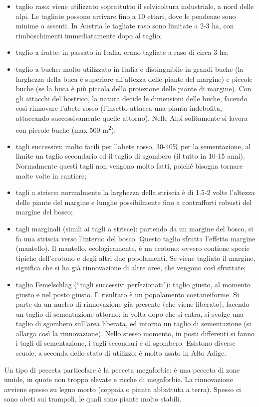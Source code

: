 \begin{itemize}[nosep]
    \item taglio raso: viene utilizzato soprattutto il selvicoltura industriale, a nord delle alpi. Le tagliate possono arrivare fino a 10 ettari, dove le pendenze sono minime o assenti. In Austria le tagliate raso sono limitate a 2-3 ha, con rimboschimenti immediatamente dopo al taglio;
    \item taglio a fratte: in passato in Italia, erano tagliate a raso di circa 3 ha;
    \item taglio a buche: molto utilizzato in Italia e distinguibile in grandi buche (la larghezza della buca è superiore all'altezza delle piante del margine) e piccole buche (se la buca è più piccola della proiezione delle piante di margine). Con gli attacchi del bostrico, la natura decide le dimensioni delle buche, facendo così rinnovare l'abete rosso (l'insetto attacca una pianta indebolita, attaccando successivamente quelle attorno). Nelle Alpi solitamente si lavora con piccole buche (max 500 \unit{m^2});
    \item tagli successivi: molto facili per l'abete rosso, 30-40\% per la sementazione, al limite un taglio secondario ed il taglio di sgombero (il tutto in 10-15 anni). Normalmente questi tagli non vengono molto fatti, poiché bisogna tornare molte volte in cantiere;
    \item tagli a strisce: normalmente la larghezza della striscia è di 1.5-2 volte l'altezza delle piante del margine e lunghe possibilmente fino a contrafforti robusti del margine del bosco;
    \item tagli marginali (simili ai tagli a strisce): partendo da un margine del bosco, si fa una striscia verso l'interno del bosco. Questo taglio sfrutta l'effetto margine (mantello). Il mantello, ecologicamente, è un ecotono: ovvero contiene specie tipiche dell'ecotono e degli altri due popolamenti. Se viene tagliato il margine, significa che si ha già rinnovazione di altre aree, che vengono così sfruttate;
    \item taglio Femelschlag (``tagli successivi perfezionati"): taglio giusto, al momento giusto e nel posto giusto. Il risultato è un popolamento coetaneiforme. Si parte da un nucleo di rinnovazione già presente (che viene liberato), facendo un taglio di sementazione attorno; la volta dopo che si entra, si svolge una taglio di sgombero sull'area liberata, ed intorno un taglio di sementazione (si allarga così la rinnovazione). Nello stesso momento, in posti differenti si fanno i tagli di sementazione, i tagli secondari e di sgombero. Esistono diverse scuole, a seconda dello stato di utilizzo; è molto usato in Alto Adige.
\end{itemize}
Un tipo di pecceta particolare è la pecceta megaforbie: è una pecceta di zone umide, in quote non troppo elevate e ricche di megaforbie. La rinnovazione avviene spesso su legno morto (ceppaia o pianta abbattuta a terra). Spesso ci sono abeti sui trampoli, le quali sono piante molto stabili. 